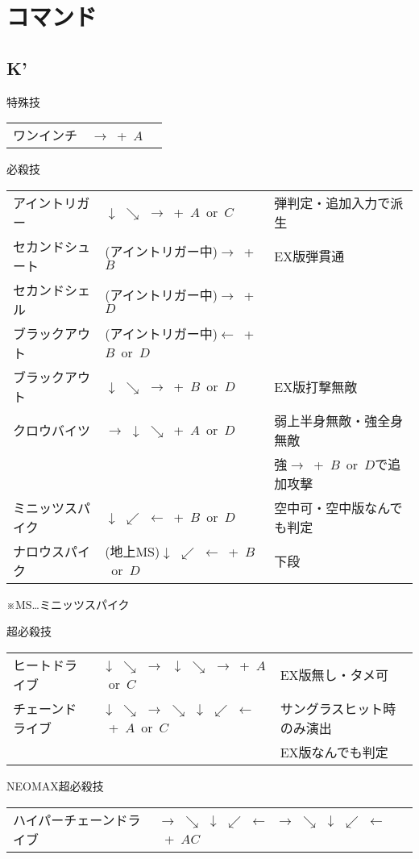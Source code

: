 \documentclass[a4j,11pt]{jarticle}
\def\hado{$\downarrow$ $\searrow$ $\rightarrow$}%
\def\tatsu{$\downarrow$ $\swarrow$ $\leftarrow$}%
\def\syoryu{$\rightarrow$ $\downarrow$ $\searrow$}%
\def\gyakuyoga{$\rightarrow$ $\searrow$ $\downarrow$ $\swarrow$ $\leftarrow$}%
\def\ryuko{$\downarrow$ $\searrow$ $\rightarrow$ $\searrow$ $\downarrow$ $\swarrow$ $\leftarrow$}%
\begin{document}
\section{コマンド}
\subsection{K'}
\begin{itembox}[l]{特殊技}
\begin{tabular}{lll}
ワンインチ&$\rightarrow$\ +\ $A$&%
\end{tabular}
\end{itembox}
\begin{itembox}[l]{必殺技}
\begin{tabular}{lll}
アイントリガー&\hado\ +\ $A$\ or\ $C$&弾判定・追加入力で派生\\%
セカンドシュート&(アイントリガー中)$\rightarrow$\ +\ $B$&EX版弾貫通\\%
セカンドシェル&(アイントリガー中)$\rightarrow$\ +\ $D$&\\%
ブラックアウト&(アイントリガー中)$\leftarrow$\ +\ $B$\ or\ $D$&\\%
ブラックアウト&\hado\ +\ $B$\ or\ $D$&EX版打撃無敵\\%
クロウバイツ&\syoryu\ +\ $A$\ or\ $D$&弱上半身無敵・強全身無敵\\%
&&強$\rightarrow$\ +\ $B$\ or\ $D$で追加攻撃\\
ミニッツスパイク&\tatsu\ +\ $B$\ or\ $D$&空中可・空中版なんでも判定\\%
ナロウスパイク&(地上MS)\tatsu\ +\ $B$\ or\ $D$&下段%
\end{tabular}
\end{itembox}
※MS…ミニッツスパイク\\
\begin{itembox}[l]{超必殺技}
\begin{tabular}{lll}
ヒートドライブ&\hado\ \hado\ +\ $A$\ or\ $C$&EX版無し・タメ可\\%
チェーンドライブ&\ryuko\ +\ $A$\ or\ $C$&サングラスヒット時のみ演出\\%
&&EX版なんでも判定
\end{tabular}
\end{itembox}
\begin{itembox}[l]{NEOMAX超必殺技}
\begin{tabular}{lll}
ハイパーチェーンドライブ&\gyakuyoga\ \gyakuyoga\ +\ $A C$&%
\end{tabular}
\end{itembox}
\newpage
\end{document}

